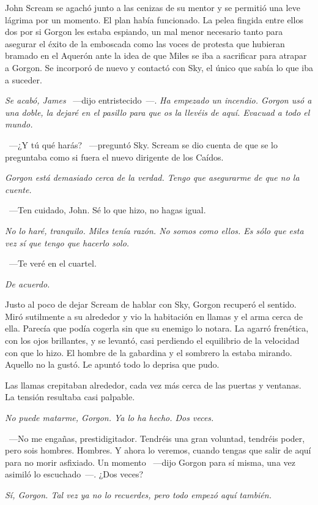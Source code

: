 John Scream se agachó junto a las cenizas de su mentor y se permitió una leve lágrima por un momento. El plan había funcionado. La pelea fingida entre ellos dos por si Gorgon les estaba espiando, un mal menor necesario tanto para asegurar el éxito de la emboscada como las voces de protesta que hubieran bramado en el Aquerón ante la idea de que Miles se iba a sacrificar para atrapar a Gorgon. Se incorporó de nuevo y contactó con Sky, el único que sabía lo que iba a suceder.

\emph{Se acabó, James} ~---dijo entristecido~---. \emph{Ha empezado un incendio. Gorgon usó a una doble, la dejaré en el pasillo para que os la llevéis de aquí. Evacuad a todo el mundo.}

~---¿Y tú qué harás? ~---preguntó Sky. Scream se dio cuenta de que se lo preguntaba como si fuera el nuevo dirigente de los Caídos.

\emph{Gorgon está demasiado cerca de la verdad. Tengo que asegurarme de que no la cuente.}

~---Ten cuidado, John. Sé lo que hizo, no hagas igual.

\emph{No lo haré, tranquilo. Miles tenía razón. No somos como ellos. Es sólo que esta vez sí que tengo que hacerlo solo.}

~---Te veré en el cuartel.

\emph{De acuerdo.}

\parbreak
Justo al poco de dejar Scream de hablar con Sky, Gorgon recuperó el sentido. Miró sutilmente a su alrededor y vio la habitación en llamas y el arma cerca de ella. Parecía que podía cogerla sin que su enemigo lo notara. La agarró frenética, con los ojos brillantes, y se levantó, casi perdiendo el equilibrio de la velocidad con que lo hizo. El hombre de la gabardina y el sombrero la estaba mirando. Aquello no la gustó. Le apuntó todo lo deprisa que pudo.

Las llamas crepitaban alrededor, cada vez más cerca de las puertas y ventanas. La tensión resultaba casi palpable.

\emph{No puede matarme, Gorgon. Ya lo ha hecho. Dos veces.}

~---No me engañas, prestidigitador. Tendréis una gran voluntad, tendréis poder, pero sois hombres. Hombres. Y ahora lo veremos, cuando tengas que salir de aquí para no morir asfixiado. Un momento ~---dijo Gorgon para sí misma, una vez asimiló lo escuchado~---. ¿Dos veces?

\emph{Sí, Gorgon. Tal vez ya no lo recuerdes, pero todo empezó aquí también.}

